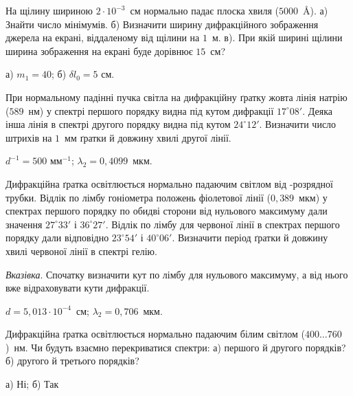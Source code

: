 \begin{problem}%
    На щілину шириною $ 2\cdot10^{-3} $~см нормально падає плоска хвиля ($5000$~\AA). а) Знайти число мінімумів. б) Визначити ширину дифракційного зображення джерела на екрані, віддаленому від щілини на $1$~м. в). При якій ширині щілини ширина зображення на екрані буде дорівнює $15$~см?
    \begin{solution}
        а) $ m_1 = 40 $; б) $ \delta l_0 = 5 $ см.
    \end{solution}
\end{problem}


\begin{problem}%
    При нормальному падінні пучка світла на дифракційну ґратку жовта
    лінія натрію ($589$~нм) у спектрі першого порядку видна під кутом
    дифракції $17^\circ08'$. Деяка інша лінія в спектрі другого порядку видна під кутом $24^\circ12'$. Визначити число штрихів на $1$~мм ґратки й довжину хвилі другої лінії.
    \begin{solution}
        $d^{-1} = 500$ мм$^{-1}$; $ \lambda_2 = 0,4099 $~мкм.
    \end{solution}
\end{problem}


\begin{problem}%
    Дифракційна ґратка освітлюється нормально падаючим світлом від -розрядної трубки. Відлік по лімбу гоніометра положень фіолетової лінії ($0,389$~мкм) у спектрах першого порядку по обидві сторони від нульового максимуму дали значення $27^\circ33'$ і $ 36^\circ27' $. Відлік по лімбу для червоної лінії в спектрах першого порядку дали відповідно $ 23^\circ54' $ і $ 40^\circ06' $. Визначити період ґратки й довжину хвилі червоної лінії в спектрі гелію.

    \medskip

    \emph{Вказівка}. Спочатку визначити кут по лімбу для нульового максимуму, а від нього вже відраховувати кути дифракції.
    \begin{solution}
         $ d = 5,013\cdot10^{-4} $~см; $ \lambda_2 = 0,706 $~мкм.
    \end{solution}
\end{problem}


\begin{problem}%
    Дифракційна ґратка освітлюється нормально падаючим білим світлом
    ($400\ldots760$)~нм. Чи будуть взаємно перекриватися спектри: а) першого й
    другого порядків? б) другого й третього порядків?
    \begin{solution}
        а) Ні; б) Так
    \end{solution}
\end{problem}


